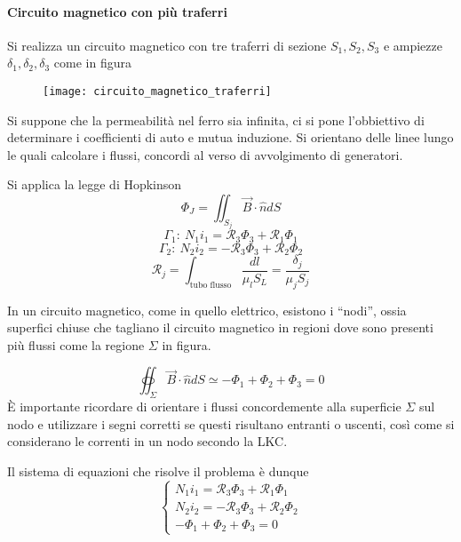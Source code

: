 
\paragraph{Circuito magnetico con più traferri}
Si realizza un circuito magnetico con tre traferri di sezione $S_1,S_2,S_3$ e 
ampiezze $\delta_1,\delta_2,\delta_3 $ come in figura
\begin{figure}[H]
\centering
\texttt{[image: circuito\_magnetico\_traferri]}
\end{figure}

Si suppone che la permeabilità nel ferro sia infinita, ci si pone l'obbiettivo di 
determinare i coefficienti di auto e mutua induzione. 
Si orientano delle linee lungo le quali calcolare i flussi, concordi al 
verso di avvolgimento di generatori.

Si applica la legge di Hopkinson
$$
\Phi_J = \iint_{S_j} \vec{B}\cdot\hat{n}dS
$$
$$
\Gamma_1:\ N_1i_1  = \mathcal{R}_3\Phi_3 + \mathcal{R}_1\Phi_1
$$
$$
\Gamma_2:\ N_2i_2 = -\mathcal{R}_3\Phi_3 + \mathcal{R}_2\Phi_2
$$
$$
\mathcal{R}_j =\int_{\text{tubo flusso}} \frac{dl}{\mu_lS_L}=\frac{\delta_j}{\mu_jS_j}
$$

In un circuito magnetico, come in quello elettrico, esistono i ``nodi'', ossia
superfici chiuse che tagliano il circuito magnetico in regioni dove sono presenti
più flussi come la regione $\Sigma$ in figura.

$$
\oiint_\Sigma\vec{B}\cdot\hat{n}dS \simeq -\Phi_1 + \Phi_2 +\Phi_3 = 0
$$
È importante ricordare di orientare i flussi concordemente alla superficie 
$\Sigma$ sul nodo e utilizzare i segni corretti se questi risultano entranti
o uscenti, così come si considerano le correnti in un nodo secondo la 
LKC.

Il sistema di equazioni che risolve il problema è dunque
$$
\begin{cases}
N_1i_1  = \mathcal{R}_3\Phi_3 + \mathcal{R}_1\Phi_1\\
N_2i_2 = -\mathcal{R}_3\Phi_3 + \mathcal{R}_2\Phi_2\\
-\Phi_1 + \Phi_2 +\Phi_3 = 0
\end{cases}
$$

